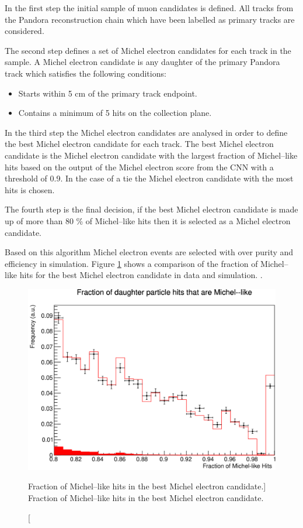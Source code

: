 In the first step the initial sample of muon candidates is defined. All tracks
from the Pandora reconstruction chain which have been labelled as primary tracks
are considered.

The second step defines a set of Michel electron candidates for each track in
the sample. A Michel electron candidate is any daughter of the primary Pandora
track which satisfies the following conditions:
\begin{itemize}
	\item Starts within 5 cm of the primary track endpoint.
	\item Contains a minimum of 5 hits on the collection plane.
\end{itemize}

In the third step the Michel electron candidates are analysed in order to define
the best Michel electron candidate for each track. The best Michel electron
candidate is the Michel electron candidate with the largest fraction of
Michel--like hits based on the output of the Michel electron score from the CNN
with a threshold of 0.9. In the case of a tie the Michel electron candidate with
the most hits is chosen.

The fourth step is the final decision, if the best Michel electron candidate is
made up of more than 80 \% of Michel--like hits then it is selected as a
Michel electron candidate.

Based on this algorithm Michel electron events are selected with over
 purity and  efficiency in \protodune{}
simulation. Figure \ref{fig:michel_like_frac} shows a comparison of the fraction of Michel--like
hits for the best Michel electron candidate in \protodune{} data and simulation.
.
\begin{figure}
	\centering
	\includegraphics[width=\textwidth]{figures/michel_like_frac.pdf}
	\caption
	[Fraction of Michel--like hits in the best Michel electron candidate.]
	{Fraction of Michel--like hits in the best Michel electron candidate.}
	\label{fig:michel_like_frac}
\end{figure}

